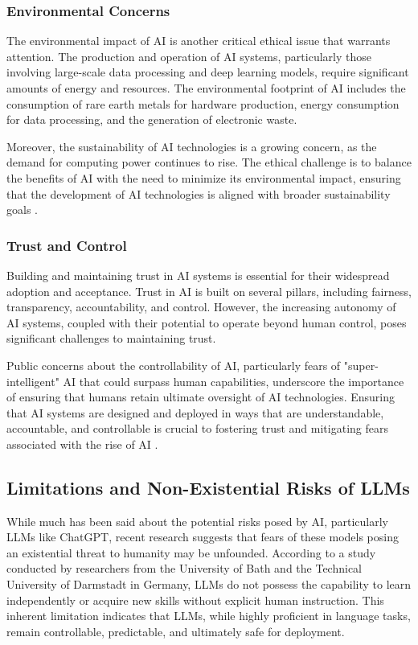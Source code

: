 \subsubsection{Environmental Concerns}

The environmental impact of AI is another critical ethical issue that warrants attention. The production and operation of AI systems, particularly those involving large-scale data processing and deep learning models, require significant amounts of energy and resources. The environmental footprint of AI includes the consumption of rare earth metals for hardware production, energy consumption for data processing, and the generation of electronic waste.

Moreover, the sustainability of AI technologies is a growing concern, as the demand for computing power continues to rise. The ethical challenge is to balance the benefits of AI with the need to minimize its environmental impact, ensuring that the development of AI technologies is aligned with broader sustainability goals \cite{huang2022overview}.

\subsubsection{Trust and Control}

Building and maintaining trust in AI systems is essential for their widespread adoption and acceptance. Trust in AI is built on several pillars, including fairness, transparency, accountability, and control. However, the increasing autonomy of AI systems, coupled with their potential to operate beyond human control, poses significant challenges to maintaining trust.

Public concerns about the controllability of AI, particularly fears of "super-intelligent" AI that could surpass human capabilities, underscore the importance of ensuring that humans retain ultimate oversight of AI technologies. Ensuring that AI systems are designed and deployed in ways that are understandable, accountable, and controllable is crucial to fostering trust and mitigating fears associated with the rise of AI \cite{huang2022overview}.

\subsection{Limitations and Non-Existential Risks of LLMs}

While much has been said about the potential risks posed by AI, particularly LLMs like ChatGPT, recent research suggests that fears of these models posing an existential threat to humanity may be unfounded. According to a study conducted by researchers from the University of Bath and the Technical University of Darmstadt in Germany, LLMs do not possess the capability to learn independently or acquire new skills without explicit human instruction. This inherent limitation indicates that LLMs, while highly proficient in language tasks, remain controllable, predictable, and ultimately safe for deployment.

